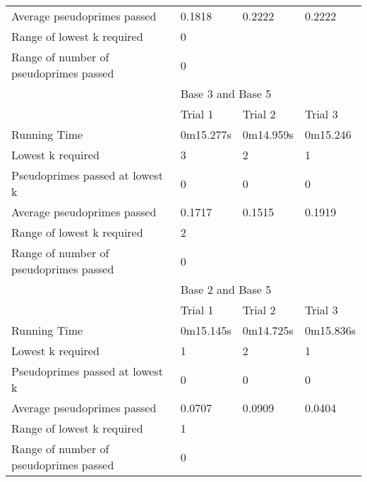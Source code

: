 \documentclass{article}
\begin{document}
\begin{appendices}
\begin{longtable}{llll}
Average pseudoprimes passed            & 0.1818    & 0.2222    & 0.2222         \\
\cmidrule(lr){2-2}\cmidrule(lr){3-3}\cmidrule(lr){4-4}
Range of lowest k required             & \multicolumn{3}{l}{0}                  \\
Range of number of pseudoprimes passed & \multicolumn{3}{l}{0}                  \\
\midrule
                                       & \multicolumn{3}{l}{Base 3 and Base 5}  \\
\midrule
                                       & Trial 1   & Trial 2   & Trial 3        \\
Running Time                           & 0m15.277s & 0m14.959s & 0m15.246       \\
Lowest k required                      & 3         & 2         & 1              \\
Pseudoprimes passed at lowest k        & 0         & 0         & 0              \\
Average pseudoprimes passed            & 0.1717    & 0.1515    & 0.1919         \\
\cmidrule(lr){2-2}\cmidrule(lr){3-3}\cmidrule(lr){4-4}
Range of lowest k required             & \multicolumn{3}{l}{2}                  \\
Range of number of pseudoprimes passed & \multicolumn{3}{l}{0}                  \\
\midrule
                                       & \multicolumn{3}{l}{Base 2 and Base 5}  \\
\midrule
                                       & Trial 1   & Trial 2   & Trial 3        \\
Running Time                           & 0m15.145s & 0m14.725s & 0m15.836s      \\
Lowest k required                      & 1         & 2         & 1              \\
Pseudoprimes passed at lowest k        & 0         & 0         & 0              \\
Average pseudoprimes passed            & 0.0707    & 0.0909    & 0.0404         \\
\cmidrule(lr){2-2}\cmidrule(lr){3-3}\cmidrule(lr){4-4}
Range of lowest k required             & \multicolumn{3}{l}{1}                  \\
Range of number of pseudoprimes passed & \multicolumn{3}{l}{0}                  \\
\bottomrule
\end{longtable}
\FloatBarrier


\end{appendices}
\end{document}
